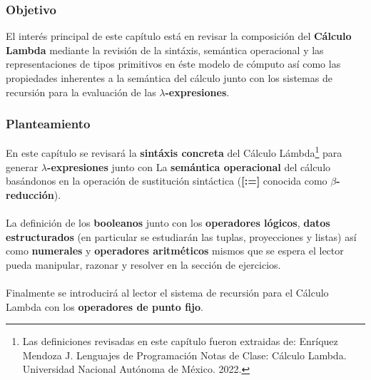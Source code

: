 \subsubsection{Objetivo}
El interés principal de este capítulo está en revisar la composición del \textbf{Cálculo Lambda} mediante la revisión de la sintáxis, semántica operacional y las representaciones de tipos primitivos en éste modelo de cómputo así como las propiedades inherentes a la semántica del cálculo junto con los sistemas de recursión para la evaluación de las \textbf{$\lambda$-expresiones}. \\ 

\subsubsection{Planteamiento}
En este capítulo se revisará la \textbf{sintáxis concreta} del Cálculo Lámbda\footnote{Las definiciones revisadas en este capítulo fueron extraidas de: Enríquez Mendoza J. Lenguajes de Programación Notas de Clase: Cálculo Lambda. Universidad Nacional Autónoma de México. 2022.} para generar \textbf{$\lambda$-expresiones} junto con
La \textbf{semántica operacional} del cálculo basándonos en la operación de sustitución sintáctica (\textbf{[:=]} conocida como \textbf{$\beta$-reducción}).\\\\
La definición de los \textbf{booleanos} junto con los \textbf{operadores lógicos}, \textbf{datos estructurados} (en particular se estudiarán las tuplas, proyecciones y listas) así como \textbf{numerales} y \textbf{operadores aritméticos} mismos que se espera el lector pueda manipular, razonar y resolver en la sección de ejercicios. \\\\
Finalmente se introducirá al lector el sistema de recursión para el Cálculo Lambda con los \textbf{operadores de punto fijo}.

\newpage

